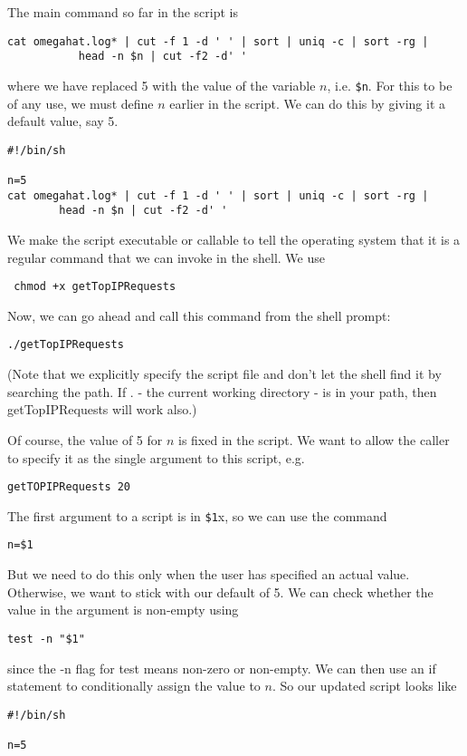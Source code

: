 \documentclass[10pt]{article}
\begin{document}
\begin{enumerate}
The main command so far in the script is
\begin{verbatim}
cat omegahat.log* | cut -f 1 -d ' ' | sort | uniq -c | sort -rg |
           head -n $n | cut -f2 -d' '
\end{verbatim}
where we have replaced 5 with the value of the variable $n$,
i.e. \verb+$n+.
For this to be of any use, we must define $n$ earlier in the script.
We can do this by giving it a default value, say 5.
\begin{verbatim}
#!/bin/sh

n=5
cat omegahat.log* | cut -f 1 -d ' ' | sort | uniq -c | sort -rg | 
        head -n $n | cut -f2 -d' '
\end{verbatim}

We make the script executable or callable to tell the operating system
that it is a regular command that we can invoke in the shell.
We use 
\begin{verbatim}
 chmod +x getTopIPRequests
\end{verbatim}

Now, we can go ahead and call this command from the shell prompt:
\begin{verbatim}
./getTopIPRequests
\end{verbatim}
(Note that we explicitly specify the script file and don't let the
shell find it by searching the path. If . - the current working
directory - is in your path, then getTopIPRequests will work also.)

Of course, the value of 5 for $n$ is fixed in the script.
We want to allow the caller to specify it as the single argument
to this script, e.g.
\begin{verbatim}
getTOPIPRequests 20
\end{verbatim}
The first argument to a script is in \verb+$1+x,
so we can use the command
\begin{verbatim}
n=$1
\end{verbatim}
But we need to do this only when the user has specified an actual
value.
Otherwise, we want to stick with our default of 5.
We can check whether the value in the argument is 
non-empty using
\begin{verbatim}
test -n "$1"
\end{verbatim}
since the -n flag for test means non-zero or non-empty.
We can then use an if statement to conditionally assign
the value to $n$. So our updated script looks like
\begin{verbatim}
#!/bin/sh

n=5


\end{verbatim}
\end{enumerate}
\end{document}
